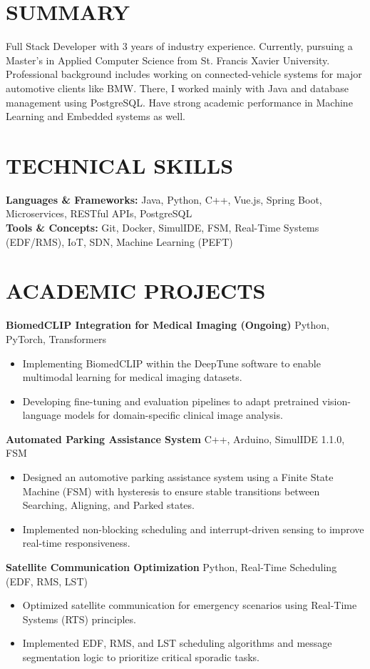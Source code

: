 \documentclass[10pt,a4paper]{article}
\begin{document}
\section*{SUMMARY}
Full Stack Developer with 3 years of industry experience. Currently, pursuing a Master's in Applied Computer Science from St. Francis Xavier University. Professional background includes working on connected-vehicle systems for major automotive clients like BMW. There, I worked mainly with Java and database management using PostgreSQL. Have strong academic performance in Machine Learning and Embedded systems as well.

\section*{TECHNICAL SKILLS}
\textbf{Languages \& Frameworks:} Java, Python, C++, Vue.js, Spring Boot, Microservices, RESTful APIs, PostgreSQL \\
\textbf{Tools \& Concepts:} Git, Docker, SimulIDE, FSM, Real-Time Systems (EDF/RMS), IoT, SDN, Machine Learning (PEFT)

\section*{ACADEMIC PROJECTS}

\textbf{BiomedCLIP Integration for Medical Imaging (Ongoing)} \hfill Python, PyTorch, Transformers
\begin{itemize}
\item Implementing BiomedCLIP within the DeepTune software to enable multimodal learning for medical imaging datasets.
\item Developing fine-tuning and evaluation pipelines to adapt pretrained vision-language models for domain-specific clinical image analysis.
\end{itemize}

\textbf{Automated Parking Assistance System} \hfill C++, Arduino, SimulIDE 1.1.0, FSM
\begin{itemize}
\item Designed an automotive parking assistance system using a Finite State Machine (FSM) with hysteresis to ensure stable transitions between Searching, Aligning, and Parked states.
\item Implemented non-blocking scheduling and interrupt-driven sensing to improve real-time responsiveness.
\end{itemize}

\textbf{Satellite Communication Optimization} \hfill Python, Real-Time Scheduling (EDF, RMS, LST)
\begin{itemize}
\item Optimized satellite communication for emergency scenarios using Real-Time Systems (RTS) principles.
\item Implemented EDF, RMS, and LST scheduling algorithms and message segmentation logic to prioritize critical sporadic tasks.
\end{itemize}
\end{document}
